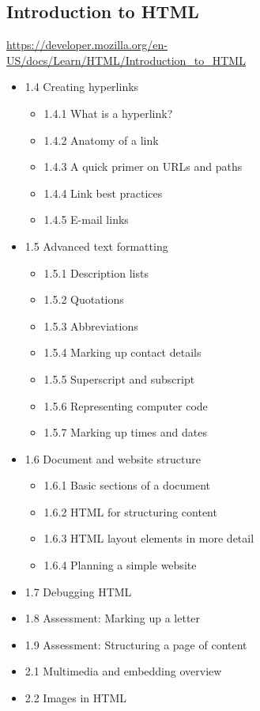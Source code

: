 \begin{mybox}
\section{Introduction to HTML}
\label{sec:org5ceddf3}
\tcblower{}
\url{https://developer.mozilla.org/en-US/docs/Learn/HTML/Introduction\_to\_HTML}
\end{mybox}\begin{myitems}
\begin{itemize}
\item 1.4 Creating hyperlinks
\begin{itemize}
\item 1.4.1 What is a hyperlink?
\item 1.4.2 Anatomy of a link
\item 1.4.3 A quick primer on URLs and paths
\item 1.4.4 Link best practices
\item 1.4.5 E-mail links
\end{itemize}
\item 1.5 Advanced text formatting
\begin{itemize}
\item 1.5.1 Description lists
\item 1.5.2 Quotations
\item 1.5.3 Abbreviations
\item 1.5.4 Marking up contact details
\item 1.5.5 Superscript and subscript
\item 1.5.6 Representing computer code
\item 1.5.7 Marking up times and dates
\end{itemize}
\item 1.6 Document and website structure
\begin{itemize}
\item 1.6.1 Basic sections of a document
\item 1.6.2 HTML for structuring content
\item 1.6.3 HTML layout elements in more detail
\item 1.6.4 Planning a simple website
\end{itemize}
\item 1.7 Debugging HTML
\item 1.8 Assessment: Marking up a letter
\item 1.9 Assessment: Structuring a page of content
\item 2.1 Multimedia and embedding overview
\item 2.2 Images in HTML
\end{itemize}


\end{myitems}
